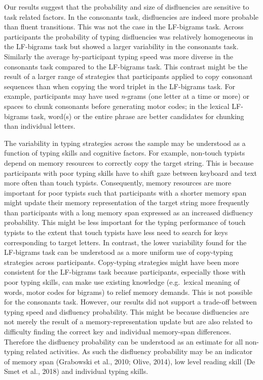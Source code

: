 \documentclass[
  english,
  man,mask,floatsintext]{apa7}
\begin{document}
Our results suggest that the probability and size of disfluencies are sensitive to task related factors. In the consonants task, disfluencies are indeed more probable than fluent transitions. This was not the case in the LF-bigrams task. Across participants the probability of typing disfluencies was relatively homogeneous in the LF-bigrams task but showed a larger variability in the consonants task. Similarly the average by-participant typing speed was more diverse in the consonants task compared to the LF-bigrams task. This contrast might be the result of a larger range of strategies that participants applied to copy consonant sequences than when copying the word triplet in the LF-bigrams task. For example, participants may have used \emph{n}-grams (one letter at a time or more) or spaces to chunk consonants before generating motor codes; in the lexical LF-bigrams task, word(s) or the entire phrase are better candidates for chunking than individual letters.

The variability in typing strategies across the sample may be understood as a function of typing skills and cognitive factors. For example, non-touch typists depend on memory resources to correctly copy the target string. This is because participants with poor typing skills have to shift gaze between keyboard and text more often than touch typists. Consequently, memory resources are more important for poor typists such that participants with a shorter memory span might update their memory representation of the target string more frequently than participants with a long memory span expressed as an increased disfluency probability. This might be less important for the typing performance of touch typists to the extent that touch typists have less need to search for keys corresponding to target letters. In contrast, the lower variability found for the LF-bigrams task can be understood as a more uniform use of copy-typing strategies across participants. Copy-typing strategies might have been more consistent for the LF-bigrams task because participants, especially those with poor typing skills, can make use existing knowledge (e.g.~lexical meaning of words, motor codes for bigrams) to relief memory demands. This is not possible for the consonants task. However, our results did not support a trade-off between typing speed and disfluency probability. This might be because disfluencies are not merely the result of a memory-representation update but are also related to difficulty finding the correct key and individual memory-span differences. Therefore the disfluency probability can be understood as an estimate for all non-typing related activities. As such the disfluency probability may be an indicator of memory span (Grabowski et al., 2010; Olive, 2014), low level reading skill (De Smet et al., 2018) and individual typing skills.
\end{document}
